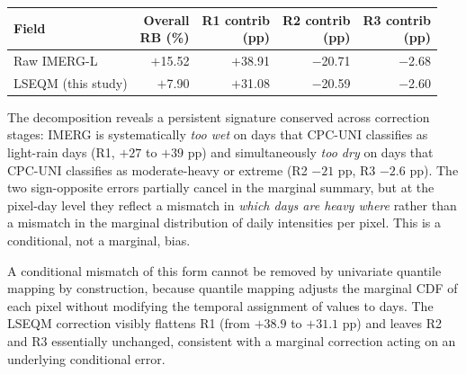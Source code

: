 \documentclass[11pt,a4paper]{article}
\begin{document}
\begin{longtable}[]{@{}lrrrr@{}}
\toprule
\textbf{Field} &
  \makecell[r]{\textbf{Overall}\\\textbf{RB (\%)}} &
  \makecell[r]{\textbf{R1 contrib}\\\textbf{(pp)}} &
  \makecell[r]{\textbf{R2 contrib}\\\textbf{(pp)}} &
  \makecell[r]{\textbf{R3 contrib}\\\textbf{(pp)}} \\
\midrule
\endhead
\bottomrule
\endlastfoot
Raw IMERG-L        & $+$15.52 & $+$38.91 & $-$20.71 & $-$2.68 \\
LSEQM (this study) & $+$7.90  & $+$31.08 & $-$20.59 & $-$2.60 \\
\end{longtable}

The decomposition reveals a persistent signature conserved across correction stages: IMERG is systematically \emph{too wet} on days that CPC-UNI classifies as light-rain days (R1, $+27$ to $+39$ pp) and simultaneously \emph{too dry} on days that CPC-UNI classifies as moderate-heavy or extreme (R2 $-21$ pp, R3 $-2.6$ pp). The two sign-opposite errors partially cancel in the marginal summary, but at the pixel-day level they reflect a mismatch in \emph{which days are heavy where} rather than a mismatch in the marginal distribution of daily intensities per pixel. This is a conditional, not a marginal, bias.

A conditional mismatch of this form cannot be removed by univariate quantile mapping by construction, because quantile mapping adjusts the marginal CDF of each pixel without modifying the temporal assignment of values to days. The LSEQM correction visibly flattens R1 (from $+38.9$ to $+31.1$ pp) and leaves R2 and R3 essentially unchanged, consistent with a marginal correction acting on an underlying conditional error.
\end{document}
